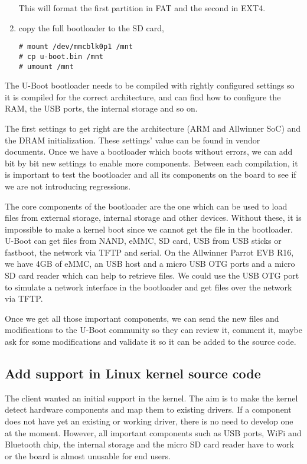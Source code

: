 \begin{enumerate}
This will format the first partition in FAT and the second in EXT4.

  \item copy the full bootloader to the SD card,

\begin{verbatim}
# mount /dev/mmcblk0p1 /mnt
# cp u-boot.bin /mnt
# umount /mnt
\end{verbatim}
\end{enumerate}

The U-Boot bootloader needs to be compiled with rightly configured settings so it is compiled for the correct architecture, and can find how to configure the RAM, the USB ports, the internal storage and so on.

The first settings to get right are the architecture (ARM and Allwinner SoC) and the DRAM initialization. These settings' value can be found in vendor documents. Once we have a bootloader which boots without errors, we can add bit by bit new settings to enable more components. Between each compilation, it is important to test the bootloader and all its components on the board to see if we are not introducing regressions.

The core components of the bootloader are the one which can be used to load files from external storage, internal storage and other devices. Without these, it is impossible to make a kernel boot since we cannot get the file in the bootloader. U-Boot can get files from NAND, eMMC, SD card, USB from USB sticks or fastboot, the network via TFTP and serial. On the Allwinner Parrot EVB R16, we have 4GB of eMMC, an USB host and a micro USB OTG ports and a micro SD card reader which can help to retrieve files. We could use the USB OTG port to simulate a network interface in the bootloader and get files over the network via TFTP.

Once we get all those important components, we can send the new files and modifications to the U-Boot community so they can review it, comment it, maybe ask for some modifications and validate it so it can be added to the source code.

\subsection{Add support in Linux kernel source code}

The client wanted an initial support in the kernel. The aim is to make the kernel detect hardware components and map them to existing drivers. If a component does not have yet an existing or working driver, there is no need to develop one at the moment. However, all important components such as USB ports, WiFi and Bluetooth chip, the internal storage and the micro SD card reader have to work or the board is almost unusable for end users.

